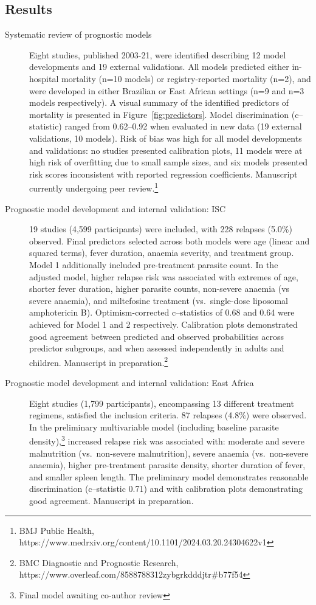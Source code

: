 \documentclass[11pt,a4paper]{article}
\begin{document}
\subsection*{Results}
\begin{description}
    \item[Systematic review of prognostic models] Eight studies, published 2003-21, were identified describing 12 model developments and 19 external validations. All models predicted either in-hospital mortality (n=10 models) or registry-reported mortality (n=2), and were developed in either Brazilian or East African settings (n=9 and n=3 models respectively). A visual summary of the identified predictors of mortality is presented in Figure~\ref{fig:predictors}. Model discrimination (c--statistic) ranged from 0.62--0.92 when evaluated in new data (19 external validations, 10 models). Risk of bias was high for all model developments and validations: no studies presented calibration plots, 11 models were at high risk of overfitting due to small sample sizes, and six models presented risk scores inconsistent with reported regression coefficients. Manuscript currently undergoing peer review.\footnote{BMJ Public Health, https://www.medrxiv.org/content/10.1101/2024.03.20.24304622v1}
    \item[Prognostic model development and internal validation: ISC] 19 studies (4,599 participants) were included, with 228 relapses (5.0\%) observed. Final predictors selected across both models were age (linear and squared terms), fever duration, anaemia severity, and treatment group. Model 1 additionally included pre-treatment parasite count. In the adjusted model, higher relapse risk was associated with extremes of age, shorter fever duration, higher parasite counts, non-severe anaemia (vs severe anaemia), and miltefosine treatment (vs.\ single-dose liposomal amphotericin B). Optimism-corrected c--statistics of 0.68 and 0.64 were achieved for Model 1 and 2 respectively. Calibration plots demonstrated good agreement between predicted and observed probabilities across predictor subgroups, and when assessed independently in adults and children. Manuscript in preparation.\footnote{BMC Diagnostic and Prognostic Research, https://www.overleaf.com/8588788312zybgrkdddjtr\#b77f54}
    \item[Prognostic model development and internal validation: East Africa] Eight studies (1,799 participants), encompassing 13 different treatment regimens, satisfied the inclusion criteria. 87 relapses (4.8\%) were observed. In the preliminary multivariable model (including baseline parasite density),\footnote{Final model awaiting co-author review} increased relapse risk was associated with: moderate and severe malnutrition (vs.\ non-severe malnutrition), severe anaemia (vs.\ non-severe anaemia), higher pre-treatment parasite density, shorter duration of fever, and smaller spleen length. The preliminary model demonstrates reasonable discrimination (c--statistic 0.71) and with calibration plots demonstrating good agreement. Manuscript in preparation.
\end{description}
\end{document}
